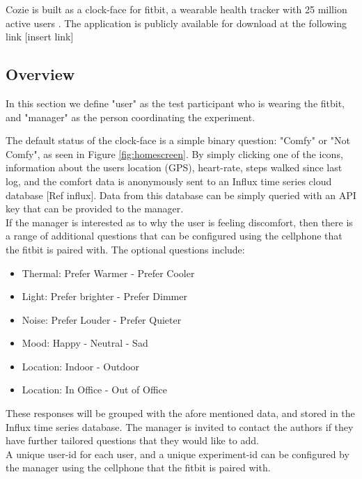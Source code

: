 
Cozie is built as a clock-face for fitbit, a wearable health tracker with 25 million active users \cite{fibit2018}. The application is publicly available for download at the following link [insert link]

\subsection{Overview}

In this section we define "user" as the test participant who is wearing the fitbit, and "manager" as the person coordinating the experiment. \ 

The default status of the clock-face is a simple binary question: "Comfy" or "Not Comfy", as seen in Figure \ref{fig:homescreen}. By simply clicking one of the icons, information about the users location (GPS), heart-rate, steps walked since last log, and the comfort data is anonymously sent to an Influx time series cloud database [Ref influx]. Data from this database can be simply queried with an API key that can be provided to the manager.\\

If the manager is interested as to why the user is feeling discomfort, then there is a range of additional questions that can be configured using the cellphone that the fitbit is paired with. The optional questions include:

\begin{itemize}
  \item Thermal: Prefer Warmer - Prefer Cooler
  \item Light: Prefer brighter - Prefer Dimmer
  \item Noise: Prefer Louder - Prefer Quieter 
  \item Mood: Happy - Neutral - Sad
  \item Location: Indoor - Outdoor
  \item Location: In Office - Out of Office
\end{itemize}

These responses will be grouped with the afore mentioned data, and stored in the Influx time series database. The manager is invited to contact the authors if they have further tailored questions that they would like to add.\\

A unique user-id for each user, and a unique experiment-id can be configured by the manager using the cellphone that the fitbit is paired with. \\

